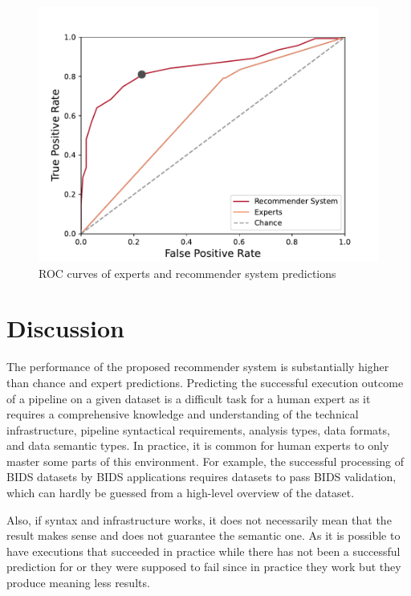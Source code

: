 \documentclass[conference]{IEEEtran}
\begin{document}
\begin{figure}
\centering
  \includegraphics[width=\columnwidth]{figures/ROC Curve.pdf}
  \caption{ROC curves of experts and recommender system predictions}
  \label{fig:roc-curve}
\end{figure}

\section{Discussion}

The performance of the proposed recommender system is substantially higher
than chance and expert predictions. Predicting the successful execution
outcome of a pipeline on a given dataset is a difficult task for a human expert as it requires a comprehensive knowledge and understanding of the technical infrastructure, pipeline syntactical requirements, analysis types, data formats, and data semantic types. In practice, it is common for human experts to only master some parts of this environment. For example,
the successful processing of BIDS datasets by BIDS applications requires
datasets to pass BIDS validation, which can hardly be guessed from a
high-level overview of the dataset. 

Also, if syntax and infrastructure works, it does not necessarily mean that the result makes sense and does not guarantee the semantic one. As it is possible to have executions that succeeded in practice while there has not been a successful prediction for or they were supposed to fail since in practice they work but they produce meaning less results. 
\end{document}
